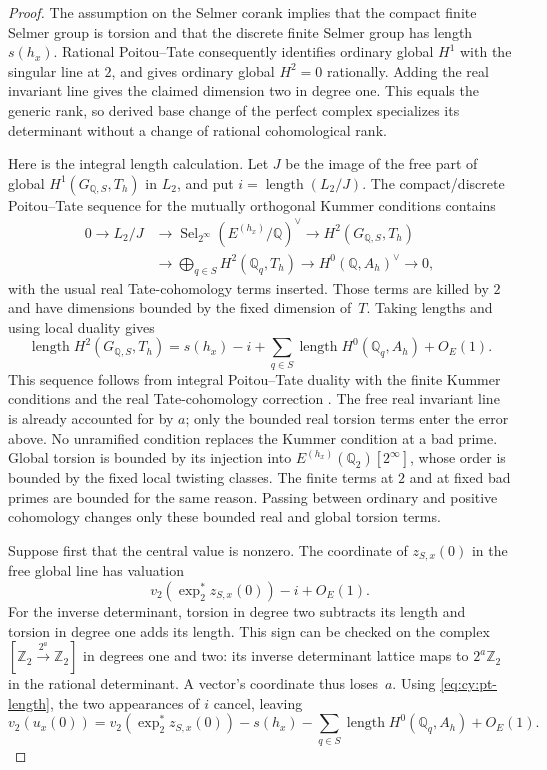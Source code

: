 \begin{proof}
The assumption on the Selmer corank implies that the compact finite
Selmer group is torsion and that the discrete finite Selmer group has
length $s(h_x)$.  Rational Poitou--Tate consequently identifies ordinary
global $H^1$ with the singular line at $2$, and gives ordinary global
$H^2=0$ rationally.  Adding the real invariant line gives the claimed
dimension two in degree one.  This equals the generic rank, so derived
base change of the perfect complex specializes its determinant without
a change of rational cohomological rank.

Here is the integral length calculation.  Let $J$ be the image of the
free part of global $H^1(G_{\mathbb Q,S},T_h)$ in $L_2$, and put
$i=\operatorname{length}(L_2/J)$.  The compact/discrete Poitou--Tate
sequence for the mutually orthogonal Kummer conditions contains
\[
\begin{aligned}
 0\longrightarrow L_2/J
 &\longrightarrow \operatorname{Sel}_{2^\infty}(E^{(h_x)}/\mathbb Q)^\vee
 \longrightarrow H^2(G_{\mathbb Q,S},T_h)\\
 &\longrightarrow \bigoplus_{q\in S}H^2(\mathbb Q _q,T_h)
 \longrightarrow H^0(\mathbb Q,A_h)^\vee\longrightarrow0,
\end{aligned}
\]
with the usual real Tate-cohomology terms inserted.  Those terms are
killed by $2$ and have dimensions bounded by the fixed dimension of~$T$.
Taking lengths and using local duality gives
\begin{equation}\label{eq:cy:pt-length}
 \operatorname{length}H^2(G_{\mathbb Q,S},T_h)
   =s(h_x)-i+\sum_{q\in S}\operatorname{length}H^0(\mathbb Q _q,A_h)
      +O_E(1).
\end{equation}
This sequence follows from integral Poitou--Tate duality with the finite
Kummer conditions and the real Tate-cohomology correction
\cite[\S\S5.7.1.6, 5.7.4--5.7.5 and 6.9.1]{Nekovar2006}.
The free real invariant line is already accounted for by $a$; only the
bounded real torsion terms enter the error above.
No unramified condition replaces
the Kummer condition at a bad prime.  Global torsion is bounded by its
injection into $E^{(h_x)}(\mathbb Q _2)[2^\infty]$, whose order is bounded
by the fixed local twisting classes.  The finite terms at $2$ and at
fixed bad primes are bounded for the same reason.  Passing between
ordinary and positive cohomology changes only these bounded real and
global torsion terms.

Suppose first that the central value is nonzero.  The coordinate of
$z_{S,x}(0)$ in the free global line has valuation
\[
 v_2(\exp_2^*z_{S,x}(0))-i+O_E(1).
\]
For the inverse determinant, torsion in degree two subtracts its length
and torsion in degree one adds its length.  This sign can be checked on
the complex $[\mathbb Z _2\xrightarrow{2^a}\mathbb Z _2]$ in degrees one
and two: its inverse determinant lattice maps to $2^a\mathbb Z _2$ in
the rational determinant.  A vector's coordinate thus loses~$a$.
Using \eqref{eq:cy:pt-length}, the two appearances of $i$ cancel, leaving
\[
 v_2(u_x(0))=
 v_2(\exp_2^*z_{S,x}(0))-s(h_x)
       -\sum_{q\in S}\operatorname{length}H^0(\mathbb Q _q,A_h)+O_E(1).
\]


\end{proof}
